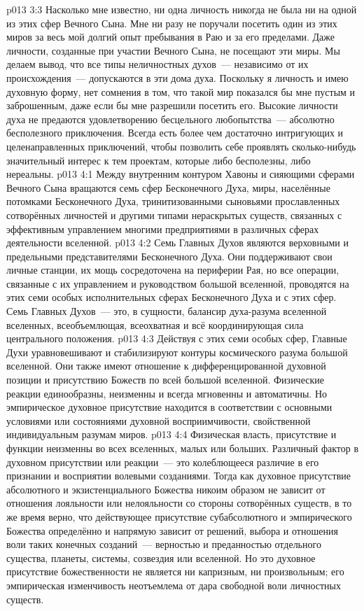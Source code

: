 \vs p013 3:3 \pc Насколько мне известно, ни одна личность никогда не была ни на одной из этих сфер Вечного Сына. Мне ни разу не поручали посетить один из этих миров за весь мой долгий опыт пребывания в Раю и за его пределами. Даже личности, созданные при участии Вечного Сына, не посещают эти миры. Мы делаем вывод, что все типы неличностных духов~--- независимо от их происхождения~--- допускаются в эти дома духа. Поскольку я личность и имею духовную форму, нет сомнения в том, что такой мир показался бы мне пустым и заброшенным, даже если бы мне разрешили посетить его. Высокие личности духа не предаются удовлетворению бесцельного любопытства~--- абсолютно бесполезного приключения. Всегда есть более чем достаточно интригующих и целенаправленных приключений, чтобы позволить себе проявлять сколько\hyp{}нибудь значительный интерес к тем проектам, которые либо бесполезны, либо нереальны.
\vs p013 4:1 Между внутренним контуром Хавоны и сияющими сферами Вечного Сына вращаются семь сфер Бесконечного Духа, миры, населённые потомками Бесконечного Духа, тринитизованными сыновьями прославленных сотворённых личностей и другими типами нераскрытых существ, связанных с эффективным управлением многими предприятиями в различных сферах деятельности вселенной.
\vs p013 4:2 Семь Главных Духов являются верховными и предельными представителями Бесконечного Духа. Они поддерживают свои личные станции, их мощь сосредоточена на периферии Рая, но все операции, связанные с их управлением и руководством большой вселенной, проводятся на этих семи особых исполнительных сферах Бесконечного Духа и с этих сфер. Семь Главных Духов~--- это, в сущности, балансир духа\hyp{}разума вселенной вселенных, всеобъемлющая, всеохватная и всё координирующая сила центрального положения.
\vs p013 4:3 Действуя с этих семи особых сфер, Главные Духи уравновешивают и стабилизируют контуры космического разума большой вселенной. Они также имеют отношение к дифференцированной духовной позиции и присутствию Божеств по всей большой вселенной. Физические реакции единообразны, неизменны и всегда мгновенны и автоматичны. Но эмпирическое духовное присутствие находится в соответствии с основными условиями или состояниями духовной восприимчивости, свойственной индивидуальным разумам миров.
\vs p013 4:4 \pc Физическая власть, присутствие и функции неизменны во всех вселенных, малых или больших. Различный фактор в духовном присутствии или реакции~--- это колеблющееся различие в его признании и восприятии волевыми созданиями. Тогда как духовное присутствие абсолютного и экзистенциального Божества никоим образом не зависит от отношения лояльности или нелояльности со стороны сотворённых существ, в то же время верно, что действующее присутствие субабсолютного и эмпирического Божества определённо и напрямую зависит от решений, выбора и отношения воли таких конечных созданий~--- верностью и преданностью отдельного существа, планеты, системы, созвездия или вселенной. Но это духовное присутствие божественности не является ни капризным, ни произвольным; его эмпирическая изменчивость неотъемлема от дара свободной воли личностных существ.

